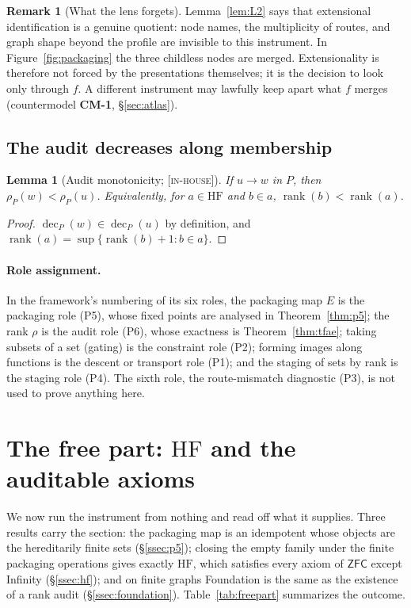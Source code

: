 \documentclass[11pt]{article}
\newcommand{\HF}{\mathrm{HF}}                 \newcommand{\rank}{\operatorname{rank}}
\newcommand{\dec}{\operatorname{dec}}
\newcommand{\gradetag}[1]{\textnormal{\textsc{[#1]}}}
\newcommand{\inhouse}{\gradetag{in-house}}
\newtheorem{lemma}[theorem]{Lemma}
\theoremstyle{definition}
\newtheorem{remark}[theorem]{Remark}
\begin{document}
\begin{remark}[What the lens forgets]\label{rem:lens-forgets}
Lemma~\ref{lem:L2} says that extensional identification is a genuine quotient: node names, the
multiplicity of routes, and graph shape beyond the profile are invisible to this instrument. In
Figure~\ref{fig:packaging} the three childless nodes are merged. Extensionality is therefore not
forced by the presentations themselves; it is the decision to look only through $f$. A different
instrument may lawfully keep apart what $f$ merges (countermodel \textbf{CM-1},
\S\ref{sec:atlas}).
\end{remark}

\subsection{The audit decreases along membership}

\begin{lemma}[Audit monotonicity; \inhouse]\label{lem:L3}
If $u\to w$ in $P$, then $\rho_P(w)<\rho_P(u)$. Equivalently, for $a\in\HF$ and $b\in a$,
$\rank(b)<\rank(a)$.
\end{lemma}

\begin{proof}
$\dec_P(w)\in\dec_P(u)$ by definition, and $\rank(a)=\sup\{\rank(b)+1: b\in a\}$.
\end{proof}

\paragraph{Role assignment.} In the framework's numbering of its six roles, the packaging map
$E$ is the packaging role (P5), whose fixed points are analysed in Theorem~\ref{thm:p5}; the rank
$\rho$ is the audit role (P6), whose exactness is Theorem~\ref{thm:tfae}; taking subsets of a
set (gating) is the constraint role (P2); forming images along functions is the descent or
transport role (P1); and the staging of sets by rank is the staging role (P4). The sixth role,
the route-mismatch diagnostic (P3), is not used to prove anything here.
 \section{The free part: \texorpdfstring{$\HF$}{HF} and the auditable axioms}\label{sec:free}

We now run the instrument from nothing and read off what it supplies. Three results carry the
section: the packaging map is an idempotent whose objects are the hereditarily finite sets
(\S\ref{ssec:p5}); closing the empty family under the finite packaging operations gives exactly
$\HF$, which satisfies every axiom of $\mathsf{ZFC}$ except Infinity (\S\ref{ssec:hf}); and on
finite graphs Foundation is the same as the existence of a rank audit (\S\ref{ssec:foundation}).
Table~\ref{tab:freepart} summarizes the outcome.
\end{document}
